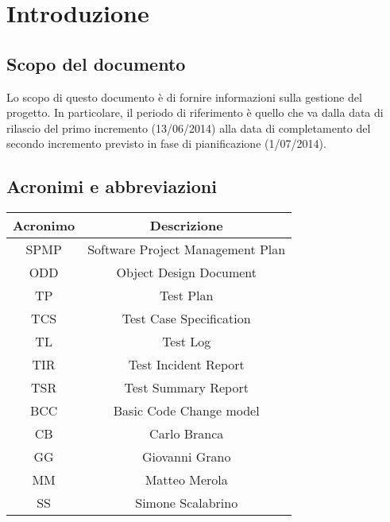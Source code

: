\chapter{Introduzione}
\section{Scopo del documento}
Lo scopo di questo documento è di fornire informazioni sulla gestione del progetto. In particolare, il periodo di riferimento è quello che va dalla data di rilascio del primo incremento (13/06/2014) alla data di completamento del secondo incremento previsto in fase di pianificazione (1/07/2014).

\section{Acronimi e abbreviazioni}
\begin{table}[ht]
\centering
\begin{tabular}{|c|c|}
 \hline
 \rowcolor{Gray}\textbf{Acronimo}			& \textbf{Descrizione}				\\
 \hline
 SPMP							& Software Project Management Plan		\\
 \hline
 ODD							& Object Design Document			\\
 \hline
 TP							& Test Plan					\\
 \hline
 TCS							& Test Case Specification			\\
 \hline
 TL							& Test Log					\\
 \hline
 TIR							& Test Incident Report				\\
 \hline
 TSR							& Test Summary Report				\\
 \hline
 BCC							& Basic Code Change model			\\
 \hline
 CB							& Carlo Branca					\\
 \hline
 GG							& Giovanni Grano				\\
 \hline
 MM							& Matteo Merola					\\
 \hline
 SS							& Simone Scalabrino				\\
 \hline
\end{tabular}
\end{table}